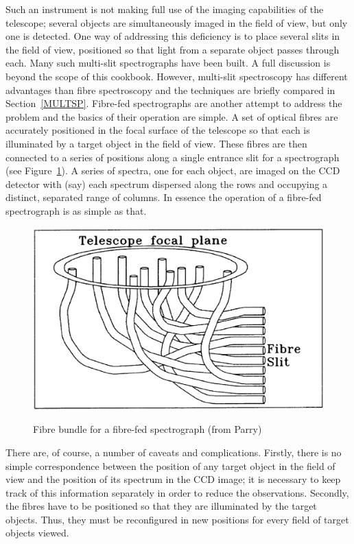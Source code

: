 \documentclass[twoside,11pt]{article}
\begin{document}
Such an instrument is not making full use of the imaging capabilities of
the telescope; several objects are simultaneously imaged in the field of
view, but only one is detected.  One way of addressing this deficiency is
to place several slits in the field of view, positioned so that light
from a separate object passes through each.  Many such multi-slit
spectrographs have been built.  A full discussion is beyond the scope of
this cookbook.  However, multi-slit spectroscopy has different advantages
than fibre spectroscopy and the techniques are briefly compared in
Section~\ref{MULTSP}.  Fibre-fed spectrographs are another
attempt to address the problem and the basics of their operation are
simple.  A set of optical fibres are accurately positioned in the focal
surface of the telescope so that each is illuminated by a target object in
the field of view.  These fibres are then connected to a series of
positions along a single entrance slit for a spectrograph (see
Figure~\ref{BUNDLE}).  A series of spectra, one for each object, are
imaged on the CCD detector with (say) each spectrum dispersed along the
rows and occupying a distinct, separated range of columns.  In essence
the operation of a fibre-fed spectrograph is as simple as that.

\begin{figure}[htbp]
   \centering 
   \includegraphics[totalheight=4in]{sc14_bundle.ps}
   \begin{quote}
   \caption[Fibre bundle for a fibre-fed spectrograph]{Fibre bundle
    for a fibre-fed spectrograph (from Parry\cite{PARRY97, PARRY98})
   \label{BUNDLE} }
   \end{quote}
\end{figure}

There are, of course, a number of caveats and complications.  Firstly,
there is no simple correspondence between the position of any target
object in the field of view and the position of its spectrum
in the CCD image; it is necessary to keep track of this information
separately in order to reduce the observations.  Secondly, the fibres
have to be positioned so that they are illuminated by the target
objects.  Thus, they must be reconfigured in new positions for every
field of target objects viewed.
\end{document}
